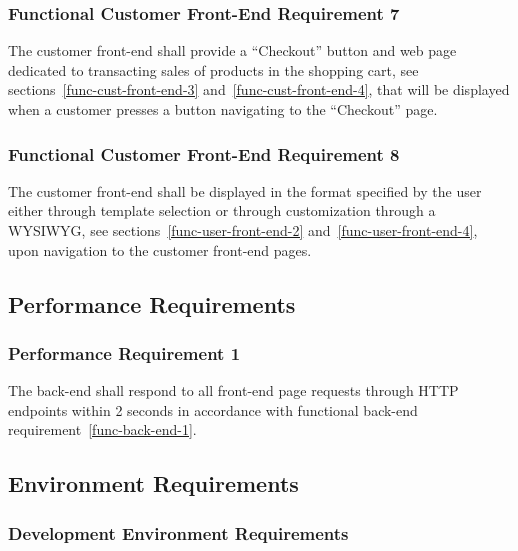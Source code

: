 \documentclass{article}
\begin{document}
\subsubsection{Functional Customer Front-End Requirement 7}
\label{func-cust-front-end-7}

The customer front-end shall provide a ``Checkout'' button and web page
dedicated to transacting sales of products in the shopping cart, see
sections~\ref{func-cust-front-end-3} and~\ref{func-cust-front-end-4}, that
will be displayed when a customer presses a button navigating to the ``Checkout''
page.

\subsubsection{Functional Customer Front-End Requirement 8}
\label{func-cust-front-end-8}

The customer front-end shall be displayed in the format specified by the user
either through template selection or through customization through a WYSIWYG,
see sections~\ref{func-user-front-end-2} and~\ref{func-user-front-end-4}, upon
navigation to the customer front-end pages.





\pagebreak
\subsection{Performance Requirements}

\subsubsection{Performance Requirement 1}
\label{perf-back-end-1}

The back-end shall respond to all front-end page requests through HTTP endpoints
within 2 seconds in accordance with functional back-end
requirement~\ref{func-back-end-1}.

\pagebreak
\subsection{Environment Requirements}

\subsubsection{Development Environment Requirements}
\end{document}
